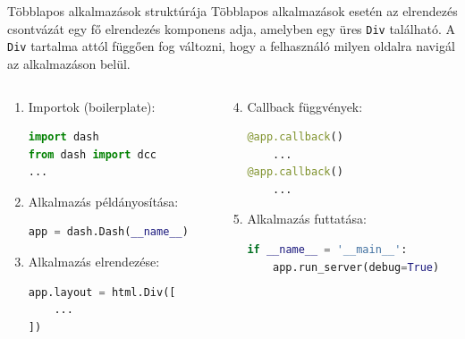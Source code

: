 \documentclass[english, aspectratio=169]{beamer}
\begin{document}
\begin{frame}[fragile]{Többlapos alkalmazások struktúrája}
	Többlapos alkalmazások esetén az elrendezés csontvázát egy fő elrendezés komponens adja, amelyben egy üres \texttt{Div} található. A \texttt{Div} tartalma attól függően fog változni, hogy a felhasználó milyen oldalra navigál az alkalmazáson belül. 
	\begin{columns}
		\begin{column}{.5\textwidth}
			\begin{enumerate}
				\item Importok (boilerplate):
					\begin{lstlisting}[language=python]
import dash
from dash import dcc
...
					\end{lstlisting}
				\item Alkalmazás példányosítása:
					\begin{lstlisting}[language=python]
app = dash.Dash(__name__)
					\end{lstlisting}
				\item Alkalmazás elrendezése:
					\begin{lstlisting}[language=python]
app.layout = html.Div([
	...
])
					\end{lstlisting}
			\end{enumerate}			
		\end{column}
		\begin{column}{.5\textwidth}
			\begin{enumerate}
				\setcounter{enumi}{3}
				\item Callback függvények:
					\begin{lstlisting}[language=python]
@app.callback()
	...
@app.callback()
	...
					\end{lstlisting}
				\item Alkalmazás futtatása:
					\begin{lstlisting}[language=python]
if __name__ = '__main__':
	app.run_server(debug=True)
					\end{lstlisting}
			\end{enumerate}
		\end{column}
	\end{columns}
\end{frame}
\end{document}
